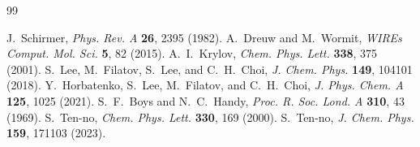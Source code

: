 \documentclass[aps,prb,reprint,superscriptaddress,floatfix]{revtex4-2}
\begin{document}
\begin{thebibliography}{99}

 J.~Schirmer, \textit{Phys. Rev. A} \textbf{26}, 2395 (1982).
 A.~Dreuw and M.~Wormit, \textit{WIREs Comput. Mol. Sci.}
\textbf{5}, 82 (2015).
 A.~I.~Krylov, \textit{Chem. Phys. Lett.} \textbf{338}, 375 (2001).
 S.~Lee, M.~Filatov, S.~Lee, and C.~H.~Choi,
\textit{J. Chem. Phys.} \textbf{149}, 104101 (2018).
 Y.~Horbatenko, S.~Lee, M.~Filatov, and C.~H.~Choi,
\textit{J. Phys. Chem. A} \textbf{125}, 1025 (2021).
 S.~F.~Boys and N.~C.~Handy,
\textit{Proc. R. Soc. Lond. A} \textbf{310}, 43 (1969).
 S.~Ten-no, \textit{Chem. Phys. Lett.} \textbf{330}, 169 (2000).
 S.~Ten-no, \textit{J. Chem. Phys.} \textbf{159}, 171103 (2023).

\end{thebibliography}
\end{document}
